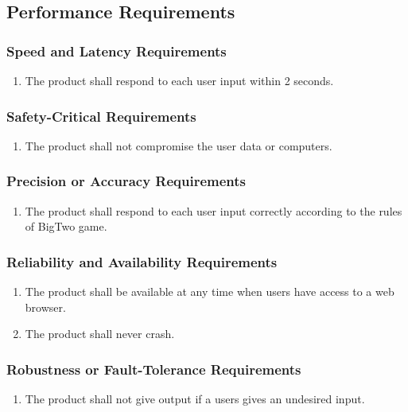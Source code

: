 \documentclass[12pt, titlepage]{article}
\begin{document}
\subsection{Performance Requirements}
\subsubsection{Speed and Latency Requirements}
\begin{enumerate}
    \item The product shall respond to each user input within 2 seconds.
\end{enumerate}

\subsubsection{Safety-Critical Requirements}
\begin{enumerate}
    \item The product shall not compromise the user data or computers.
\end{enumerate}

\subsubsection{Precision or Accuracy Requirements}
\begin{enumerate}
    \item The product shall respond to each user input correctly according to the rules of BigTwo game.
\end{enumerate}

\subsubsection{Reliability and Availability Requirements}
\begin{enumerate}
    \item The product shall be available at any time when users have access to a web browser.
    \item The product shall never crash.
\end{enumerate}

\subsubsection{Robustness or Fault-Tolerance Requirements}
\begin{enumerate}
    \item The product shall not give output if a users gives an undesired input.
\end{enumerate}
\end{document}
